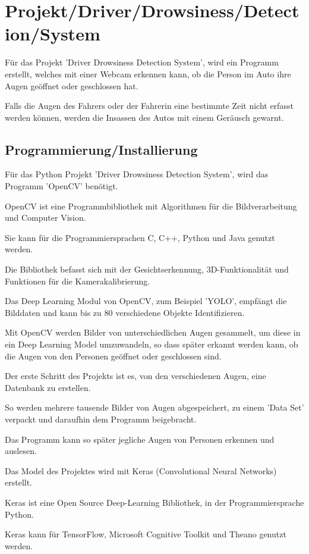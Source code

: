 \section{Projekt/Driver/Drowsiness/Detection/System}

Für das Projekt 'Driver Drowsiness Detection System', wird ein Programm erstellt, welches mit einer Webcam erkennen kann, ob die Person im Auto ihre Augen geöffnet oder geschlossen hat.

Falls die Augen des Fahrers oder der Fahrerin eine 
bestimmte Zeit nicht erfasst werden können, werden die Insassen des Autos mit einem Geräusch gewarnt.

\subsection{Programmierung/Installierung}

Für das Python Projekt 'Driver Drowsiness Detection System', wird das Programm 'OpenCV' benötigt. 

OpenCV ist eine Programmbibliothek mit Algorithmen für die Bildverarbeitung und Computer Vision.

Sie kann für die Programmiersprachen C, C++, Python und Java genutzt werden.

Die Bibliothek befasst sich mit der Gesichtserkennung, 3D-Funktionalität und Funktionen für die Kamerakalibrierung.

Das Deep Learning Modul von OpenCV, zum Beispiel 'YOLO', empfängt die Bilddaten und kann bis zu 80 verschiedene Objekte Identifizieren.

Mit OpenCV werden Bilder von unterschiedlichen Augen gesammelt, um diese in ein Deep Learning Model umzuwandeln, so dass später erkannt werden kann, ob die Augen von den Personen geöffnet oder geschlossen sind.

Der erste Schritt des Projekts ist es, von den verschiedenen Augen, eine Datenbank zu erstellen.

So werden mehrere tausende Bilder von Augen 
abgespeichert, zu einem 'Data Set' verpackt und daraufhin dem Programm beigebracht. 

Das Programm kann so später jegliche Augen von Personen erkennen und auslesen.   


Das Model des Projektes wird mit Keras (Convolutional Neural Networks) erstellt. 

Keras ist eine Open Source Deep-Learning Bibliothek, in der Programmiersprache Python.

Keras kann für TensorFlow, Microsoft Cognitive Toolkit und Theano genutzt werden.


